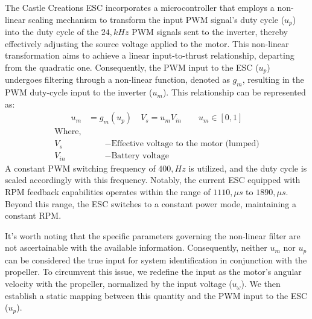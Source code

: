 The Castle Creations ESC incorporates a microcontroller that employs a non-linear scaling mechanism to transform the input PWM signal's duty cycle ($u_p$) into the duty cycle of the $24,kHz$ PWM signals sent to the inverter, thereby effectively adjusting the source voltage applied to the motor\cite{kim2017electric}. This non-linear transformation aims to achieve a linear input-to-thrust relationship, departing from the quadratic one. Consequently, the PWM input to the ESC ($u_p$) undergoes filtering through a non-linear function, denoted as $g_m$, resulting in the PWM duty-cycle input to the inverter ($u_m$). This relationship can be represented as:
\begin{align}\label{eqn::esc_input}
    u_m &= g_m(u_p)\quad
    V_s = u_m V_{in} \qquad u_m \in [0, 1]
\end{align}
\begin{align*}
\text{Where,}\qquad&\\
    V_s &- \text{Effective voltage to the motor (lumped)}\\
    V_{in} &- \text{Battery voltage}
\end{align*}
A constant PWM switching frequency of $400 , Hz$ is utilized, and the duty cycle is scaled accordingly with this frequency. Notably, the current ESC equipped with RPM feedback capabilities operates within the range of $1110 , \mu s$ to $1890 , \mu s$. Beyond this range, the ESC switches to a constant power mode, maintaining a constant RPM.

It's worth noting that the specific parameters governing the non-linear filter are not ascertainable with the available information. Consequently, neither $u_m$ nor $u_p$ can be considered the true input for system identification in conjunction with the propeller. To circumvent this issue, we redefine the input as the motor's angular velocity with the propeller, normalized by the input voltage ($u_\omega$). We then establish a static mapping between this quantity and the PWM input to the ESC ($u_p$).
